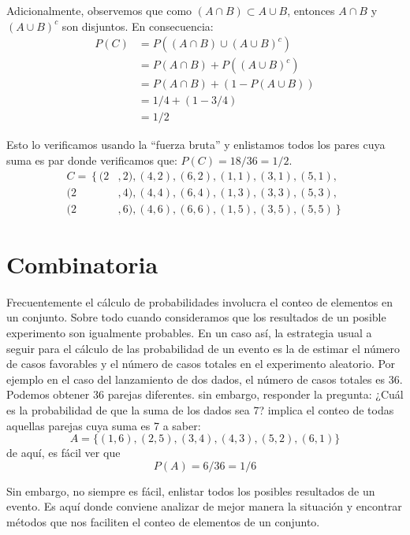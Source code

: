 \documentclass[14pt]{extreport}
\newcounter{ejemplo}[chapter]
\begin{document}
Adicionalmente, observemos que como $(A \cap B) \subset A \cup B$, entonces $A \cap B$ y $(A
\cup B)^c$ son disjuntos. En consecuencia: 
\begin{equation*}
    \begin{split}
        P(C ) & = P((A \cap B) \cup (A \cup B)^c ) \\
              & = P(A \cap B) + P((A \cup B)^c )    \\
              & = P(A \cap B) + (1 - P(A \cup B)) \\
              & = 1/4 + (1-3/4)\\
              & = 1/2
    \end{split}
\end{equation*}

Esto lo verificamos usando la ``fuerza bruta'' y enlistamos todos los pares cuya suma es par donde verificamos que: $P(C ) = 18/36 = 1/2$. 
\begin{equation*}
    \begin{split}
        C = \left\{\right. (2&, 2), (4, 2), (6, 2),(1, 1), (3, 1), (5, 1),\\
                           (2&, 4), (4, 4), (6, 4),(1, 3), (3, 3), (5, 3),\\
                           (2&, 6), (4, 6), (6, 6),(1, 5), (3, 5), (5, 5)\left.\right\}       
    \end{split}
\end{equation*}
\chapter{Combinatoria}
Frecuentemente el cálculo de probabilidades involucra el conteo de elementos en un conjunto. Sobre todo cuando consideramos que los resultados de un posible experimento son igualmente probables. En un caso así, la estrategia usual a seguir para el cálculo de las probabilidad de un evento es la de estimar el número de casos favorables y el número de casos totales en el experimento aleatorio. Por ejemplo en el caso del lanzamiento de dos dados, el número de casos totales es 36. Podemos obtener 36 parejas diferentes. sin embargo, responder la pregunta: ¿Cuál es la probabilidad de que la suma de los dados sea 7? implica el conteo de todas aquellas parejas cuya suma es 7 a saber: 
$$
A = \{(1, 6), (2, 5), (3, 4), (4, 3), (5, 2), (6, 1)\} 
$$
de aquí, es fácil ver que
$$
P(A) = 6/36 = 1/6
$$

Sin embargo, no siempre es fácil, enlistar todos los
posibles resultados de un evento. Es aquí donde conviene analizar de
mejor manera la situación y encontrar métodos que nos faciliten el
conteo de elementos de un conjunto.
\end{document}
